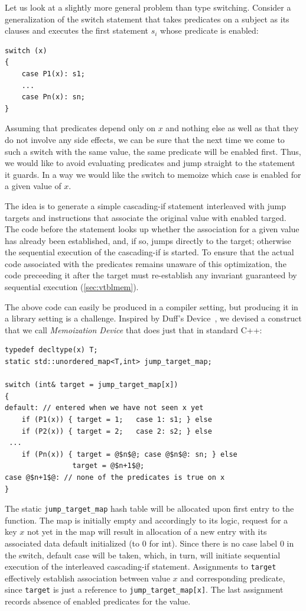 \documentclass[preprint]{sigplanconf}
\makeatletter
\DeclareRobustCommand{\code}[1]{{\lstinline[breaklines=false,escapechar=@]{#1}}}
\makeatother
\begin{document}
Let us look at a slightly more general problem than type switching. Consider a 
generalization of the switch statement that takes predicates on a subject as its 
clauses and executes the first statement $s_i$ whose predicate is enabled: 

\begin{lstlisting}
switch (x)
{
    case P1(x): s1;
    ...
    case Pn(x): sn;
}
\end{lstlisting}

\noindent
Assuming that predicates depend only on $x$ and nothing else as well as that 
they do not involve any side effects, we can be sure that the next time we come 
to such a switch with the same value, the same predicate will be enabled 
first. Thus, we would like to avoid evaluating predicates and jump straight to 
the statement it guards. In a way we would like the switch to  memoize which 
case is enabled for a given value of $x$.

The idea is to generate a simple cascading-if statement interleaved with jump 
targets and instructions that associate the original value with enabled targed. 
The code before the statement looks up whether the association for a given value 
has already been established, and, if so, jumps directly to the target; otherwise 
the sequential execution of the cascading-if is started. To ensure 
that the actual code associated with the predicates remains unaware of this 
optimization, the code preceeding it after the target must re-establish any 
invariant guaranteed by sequential execution (\textsection\ref{sec:vtblmem}).

The above code can easily be produced in a compiler setting, but producing it in 
a library setting is a challenge. Inspired by Duff's Device~\cite{Duff}, 
we devised a construct that we call \emph{Memoization Device} that does just 
that in standard C++:

\begin{lstlisting}
typedef decltype(x) T;
static std::unordered_map<T,int> jump_target_map;

switch (int& target = jump_target_map[x])
{
default: // entered when we have not seen x yet
    if (P1(x)) { target = 1;   case 1: s1; } else 
    if (P2(x)) { target = 2;   case 2: s2; } else
 ...
    if (Pn(x)) { target = @$n$@; case @$n$@: sn; } else
                target = @$n+1$@;
case @$n+1$@: // none of the predicates is true on x
}
\end{lstlisting}

\noindent
The static \code{jump_target_map} hash table will be allocated upon first entry 
to the function. The map is initially empty and accordingly to its logic, 
request for a key $x$ not yet in the map will result in allocation of a 
new entry with its associated data default initialized (to 0 for int). Since 
there is no case label 0 in the switch, default case will be taken, which, in 
turn, will initiate sequential execution of the interleaved cascading-if 
statement. Assignments to \code{target} effectively establish association 
between value $x$ and corresponding predicate, since \code{target} is just a 
reference to \code{jump_target_map[x]}. The last assignment records absence of 
enabled predicates for the value.
\end{document}
